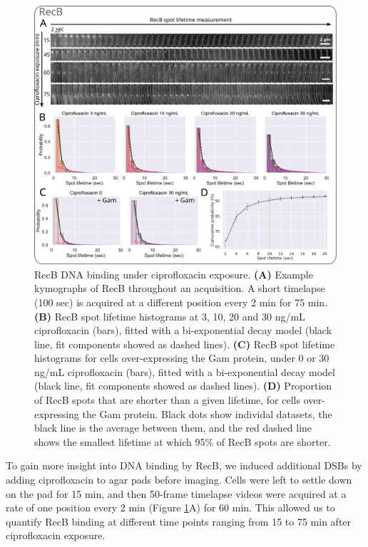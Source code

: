 \begin{figure}[htbp]
    \centering
    \includegraphics[width=\textwidth]{Figures/Fig2_cipro_nSpots.pdf}
    \caption{RecB DNA binding under ciprofloxacin exposure. \textbf{(A)} Example kymographs of RecB throughout an acquisition. A short timelapse (100 sec) is acquired at a different position every 2 min for 75 min. \textbf{(B)} RecB spot lifetime histograms at 3, 10, 20 and 30 ng/mL ciprofloxacin (bars), fitted with a bi-exponential decay model (black line, fit components showed as dashed lines). \textbf{(C)} RecB spot lifetime histograms for cells over-expressing the Gam protein, under 0 or 30 ng/mL ciprofloxacin (bars), fitted with a bi-exponential decay model (black line, fit components showed as dashed lines). \textbf{(D)} Proportion of RecB spots that are shorter than a given lifetime, for cells over-expressing the Gam protein. Black dots show individal datasets, the black line is the average between them, and the red dashed line shows the smallest lifetime at which 95\% of RecB spots are shorter.}
    \label{Fig:lifetime_fits}
\end{figure}

To gain more insight into DNA binding by RecB, we induced additional DSBs by adding ciprofloxacin to agar pads before imaging. Cells were left to settle down on the pad for 15 min, and then 50-frame timelapse videos were acquired at a rate of one position every 2 min (Figure \ref{Fig:lifetime_fits}A) for 60 min. This allowed us to quantify RecB binding at different time points ranging from 15 to 75 min after ciprofloxacin exposure.

